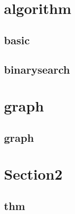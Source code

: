 \section{algorithm}
        \subsection{basic}
            
        \subsection{binarysearch}
            


\section{graph}
        \subsection{graph}
            
  

\section{Section2}
    \subsection{thm}
        